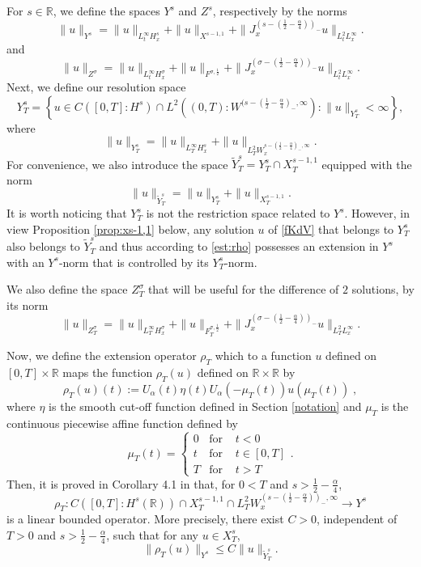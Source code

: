 \documentclass{amsart}
\theoremstyle{definition}
\theoremstyle{remark}
\def\R{{\mathbb R}}
\numberwithin{equation}{section}
\begin{document}
For $s\in\R$, we define the spaces $Y^s$ and $Z^s$, respectively by the norms
\begin{equation}\label{Y}
\|u\|_{Y^s} = \|u\|_{L^\infty_t H^s_x} + \|u\|_{X^{s-1,1}} + \|J_x^{(s-(\frac12-\frac \alpha 4))_-}u\|_{L^2_t L^\infty_x}.
\end{equation}
and
$$
\|u\|_{Z^\sigma} = \|u\|_{L^\infty_t H^\sigma_x} + \|u\|_{F^{\sigma,\frac12}} + \|J_x^{(\sigma-(\frac12-\frac \alpha 4))_-}u\|_{L^2_t L^\infty_x}.
$$
Next, we define our resolution space
\[Y^s_T=\left\{ u \in C([0,T] :H^s) \cap L^2((0,T) : W^{(s-(\frac12-\frac{\alpha}4)_-,\infty}) : \|u\|_{Y^s_T} <\infty \right\}, \] where
\begin{equation} \label{def:XT}
\|u\|_{Y^s_T}= \|u\|_{L^{\infty}_TH^s_x}+ \|u\|_{L^2_TW^{s-(\frac12-\frac{\alpha}4)_-,\infty}_x} .
\end{equation}
For convenience, we also introduce the space $\widetilde{Y}^s_T = Y^s_T\cap X^{s-1,1}_T$ equipped with the norm
$$
\|u\|_{\widetilde{Y}^s_T} = \|u\|_{Y^s_T} +\|u\|_{X^{s-1,1}_T}.
$$ 
It is worth noticing that $Y^s_T$ is not the  restriction space related to $ Y^s $. However, in view Proposition \ref{prop:xs-1,1} below, any solution $u $ of \eqref{fKdV} that belongs to $Y^s_T $ also belongs to $\widetilde{Y}^s_T$ and thus according to \eqref{est:rho} possesses an extension in $ Y^s $ with an $ Y^s$-norm that is controlled by its $Y^s_T$-norm. 

We also define the space $Z^\sigma_T$ that will be useful for the difference of $2$ solutions, by its norm 
$$
\|u\|_{Z^\sigma_T} = \|u\|_{L^\infty_T H^\sigma_x} + \|u\|_{F^{\sigma,\frac12}_T} + \|J_x^{(\sigma-(\frac12-\frac \alpha 4))_-}u\|_{L^2_T L^\infty_x}.
$$

Now, we define the extension operator $\rho_T$ which to a function $u$ defined on $[0,T] \times \mathbb R$ maps the function $\rho_T(u)$ defined on $\mathbb R \times \mathbb R$ by 
\begin{equation}\label{defrho}
\rho_T(u)(t):= U_\alpha(t)\eta(t) U_\alpha(-\mu_T(t)) u(\mu_T(t))\; ,
\end{equation}
where $ \eta $ is the smooth cut-off function defined in Section \ref{notation} and $\mu_T $ is the  continuous piecewise affine
 function defined  by
$$
 \mu_T(t)=\left\{\begin{array}{rcl}
 0  &\text{for } &  t<0 \\
 t  &\text {for }& t\in [0,T] \\
  T & \text {for } & t>T
 \end{array}
 \right. .
 $$
 Then, it is proved in Corollary 4.1 in \cite{MPV}  that, for $0<T$ and $s>\frac12-\frac{\alpha}4$,
 \[ \rho_T: C([0,T]:H^s(\R)) \cap X^{s-1,1}_T \cap L^2_TW_x^{(s-(\frac12-\frac{\alpha}4))_-,\infty} \longrightarrow Y^s \]
 is a linear bounded operator. More precisely, there exist $C>0$, independent of $T>0$ and $s>\frac12-\frac{\alpha}4$, such that for any $u \in X^s_T$, 
 \begin{equation} \label{est:rho}
 \|\rho_T(u)\|_{Y^s} \leq C \|u\|_{\widetilde{Y}^s_T}  .
 \end{equation}
\end{document}
